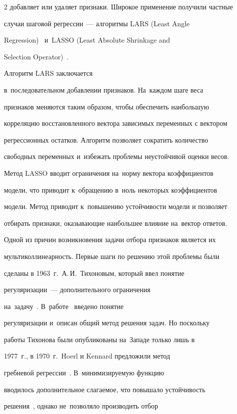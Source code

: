 \begin{multicols}{2}
добавляет или удаляет признаки. Широкое применение получили частные

случаи шаговой регрессии~--- алгоритмы  LARS (Least Angle

Regression)~\cite{lars} и~LASSO (Least Absolute Shrinkage and

Selection Operator)~\cite{lasso}. 



Алгоритм LARS заключается

в~последовательном добавлении признаков. На~каж\-дом шаге веса

признаков меняются таким образом, чтобы обеспечить наибольшую

корреляцию восстановленного вектора зависимых переменных с вектором

регрессионных остатков. Алгоритм позволяет сократить количество

свободных переменных и~избежать проб\-ле\-мы неустойчивой оценки весов.



Метод LASSO вводит ограничения на~норму вектора коэффициентов

модели, что приводит к~обращению в~ноль некоторых коэффициентов

модели. Метод приводит к~повышению устойчивости модели и позволяет

отбирать признаки, ока\-зы\-ва\-ющие наибольшее влияние на~вектор ответов.



Одной из причин возникновения задачи отбора признаков является их

мультиколлинеарность. Первые шаги по решению этой проблемы были

сделаны в 1963~г.\ А.\,И.~Тихоновым, который ввел понятие

регуляризации~--- дополнительного ограничения

на~задачу~\cite{regular}. В~работе~\cite{ridzh1} введено понятие

регуляризации и~описан общий метод решения задач. Но поскольку

работы Тихонова были опуб\-ли\-ко\-ва\-ны на~Западе только лишь в

1977~г., в 1970~г.\ Hoerl и Kennard предложили метод

гребневой регрессии~\cite{ridzh2}. В~минимизируемую функцию

вводилось дополнительное слагаемое, что повышало устойчивость

решения~\cite{ridzh3}, однако не~позволяло производить отбор


\end{multicols}
